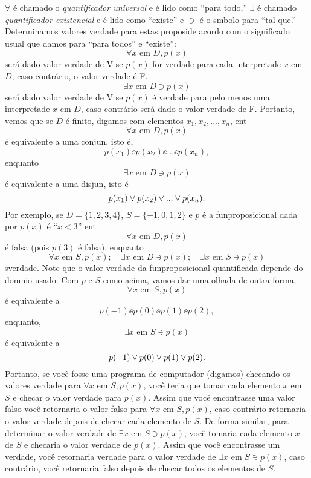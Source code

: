 $\forall$ \'e chamado o {\it quantificador universal} e \'e lido como ``para todo,'' $\exists$ \'e chamado {\it quantificador existencial} e \'e lido como ``existe'' e $\ni$ \'e o s\ih mbolo para ``tal que.'' Determinamos valores verdade para estas proposi\coes de acordo com o significado usual que damos para ``para todos'' e ``existe'':
\[
\forall x \textrm{ em } D, p(x)
\] 
ser\'a dado valor verdade de V se $p(x)$ for verdade para cada interpreta\cao de $x$ em $D$, caso contr\'ario, o valor verdade \'e F.
\[
\exists x \textrm{ em } D \ni p(x)
\] 
ser\'a dado valor verdade de V se $p(x)$ \'e verdade para pelo menos uma interpreta\cao de $x$ em $D$, caso contr\'ario ser\'a dado o valor verdade de F. Portanto, vemos que se $D$ \'e finito, digamos com elementos $x_1,x_2,...,x_n$, ent\ao
\[
\forall x \textrm{ em } D, p(x)
\] 
\'e equivalente a uma conjun\caoi, isto \'e,
\[
p(x_1)\ee p(x_2)\ee ... \ee p(x_n),
\]
enquanto
\[
\exists x \textrm{ em } D \ni p(x)
\]
\'e equivalente a uma disjun\caoi, isto \'e
\[
p(x_1)\vee p(x_2)\vee ... \vee p(x_n).
\]
Por exemplo, se $D=\{1,2,3,4\}$, $S=\{-1,0,1,2\}$ e $p$ \'e a fun\cao proposicional dada por $p(x)$ \'e ``$x<3$'' ent\ao 
\[
\forall x \textrm{ em } D, p(x)
\]
\'e falsa (pois $p(3)$ \'e falsa), enquanto
\[
\forall x \textrm{ em } S, p(x); \quad \exists x \textrm{ em } D \ni p(x); \quad \exists x \textrm{ em } S \ni p(x) 
\]
s\ao verdade. Note que o valor verdade da fun\cao proposicional quantificada depende do dom\ih nio usado. Com $p$ e $S$ como acima, vamos dar uma olhada de outra forma.
\[
\forall x \textrm{ em } S, p(x)
\]
\'e equivalente a
\[
p(-1)\ee p(0)\ee p(1) \ee p(2),
\]
enquanto,
\[
\exists x \textrm{ em } S \ni p(x)
\]
\'e equivalente a
\[
p(-1)\vee p(0)\vee p(1) \vee p(2).
\]
Portanto, se voc\^e fosse uma programa de computador (digamos) checando os valores verdade para $\forall x \textrm{ em } S, p(x)$, voc\^e teria que tomar cada elemento $x$ em $S$ e checar o valor verdade para $p(x)$. Assim que voc\^e encontrasse uma valor falso voc\^e retornaria o valor falso para $\forall x \textrm{ em } S, p(x)$, caso contr\'ario retornaria o valor verdade depois de checar cada elemento de $S$. De forma similar, para determinar o valor verdade de $\exists x \textrm{ em } S \ni p(x)$, voc\^e tomaria cada elemento $x$ de $S$ e checaria o valor verdade de $p(x)$. Assim que voc\^e encontrasse um verdade, voc\^e retornaria verdade para o valor verdade de $\exists x \textrm{ em } S \ni p(x)$, caso contr\'ario, voc\^e retornaria falso depois de checar todos os elementos de $S$.

